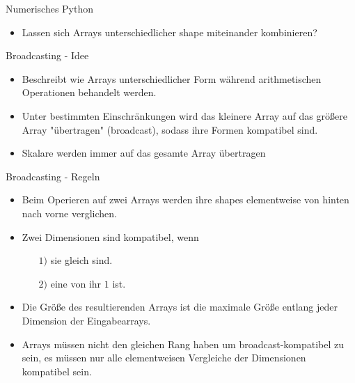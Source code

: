 \documentclass[utf8, smaller, c]{beamer}
\begin{document}
\begin{frame}{Numerisches Python}
    \pagebreak
    
    \vspace*{3mm}
    \begin{itemize}
        \item Lassen sich Arrays unterschiedlicher shape miteinander kombinieren?
    \end{itemize}
	\begin{block}{Broadcasting - Idee}
		\begin{itemize}
			\item Beschreibt wie Arrays unterschiedlicher Form während arithmetischen Operationen behandelt werden.
			\item Unter bestimmten Einschränkungen wird das kleinere Array auf das größere Array "übertragen" (broadcast), sodass ihre Formen kompatibel sind.
			\item Skalare werden immer auf das gesamte Array übertragen
		\end{itemize}
	\end{block}

	\pagebreak

	\begin{block}{Broadcasting - Regeln}
		\begin{itemize}
			\item Beim Operieren auf zwei Arrays werden ihre shapes elementweise von hinten nach vorne verglichen.
			\item Zwei Dimensionen sind kompatibel, wenn
			\begin{itemize}
				\item[$1)$] sie gleich sind.
				\item[$2)$] eine von ihr $1$ ist.
			\end{itemize}
			\item Die Größe des resultierenden Arrays ist die maximale Größe entlang jeder Dimension der Eingabearrays.
			\item Arrays müssen nicht den gleichen Rang haben um broadcast-kompatibel zu sein, es müssen nur alle elementweisen Vergleiche der Dimensionen kompatibel sein.
		\end{itemize}
	\end{block}
	
	\pagebreak
	

\end{frame}
\end{document}
